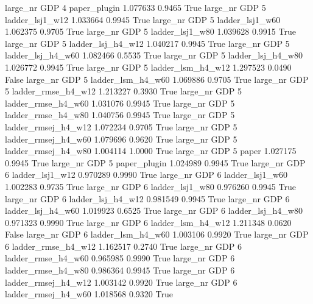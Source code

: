   large_nr      GDP                 4        paper_plugin   1.077633      0.9465    True
  large_nr      GDP                 5     ladder_lsj1_w12   1.033664      0.9945    True
  large_nr      GDP                 5     ladder_lsj1_w60   1.062375      0.9705    True
  large_nr      GDP                 5     ladder_lsj1_w80   1.039628      0.9915    True
  large_nr      GDP                 5   ladder_lsj_h4_w12   1.040217      0.9945    True
  large_nr      GDP                 5   ladder_lsj_h4_w60   1.082466      0.5535    True
  large_nr      GDP                 5   ladder_lsj_h4_w80   1.026772      0.9945    True
  large_nr      GDP                 5   ladder_lsm_h4_w12   1.297523      0.0490   False
  large_nr      GDP                 5   ladder_lsm_h4_w60   1.069886      0.9705    True
  large_nr      GDP                 5  ladder_rmse_h4_w12   1.213227      0.3930    True
  large_nr      GDP                 5  ladder_rmse_h4_w60   1.031076      0.9945    True
  large_nr      GDP                 5  ladder_rmse_h4_w80   1.040756      0.9945    True
  large_nr      GDP                 5 ladder_rmsej_h4_w12   1.072234      0.9705    True
  large_nr      GDP                 5 ladder_rmsej_h4_w60   1.079696      0.9620    True
  large_nr      GDP                 5 ladder_rmsej_h4_w80   1.004114      1.0000    True
  large_nr      GDP                 5               paper   1.027175      0.9945    True
  large_nr      GDP                 5        paper_plugin   1.024989      0.9945    True
  large_nr      GDP                 6     ladder_lsj1_w12   0.970289      0.9990    True
  large_nr      GDP                 6     ladder_lsj1_w60   1.002283      0.9735    True
  large_nr      GDP                 6     ladder_lsj1_w80   0.976260      0.9945    True
  large_nr      GDP                 6   ladder_lsj_h4_w12   0.981549      0.9945    True
  large_nr      GDP                 6   ladder_lsj_h4_w60   1.019923      0.6525    True
  large_nr      GDP                 6   ladder_lsj_h4_w80   0.971323      0.9990    True
  large_nr      GDP                 6   ladder_lsm_h4_w12   1.211348      0.0620   False
  large_nr      GDP                 6   ladder_lsm_h4_w60   1.003106      0.9920    True
  large_nr      GDP                 6  ladder_rmse_h4_w12   1.162517      0.2740    True
  large_nr      GDP                 6  ladder_rmse_h4_w60   0.965985      0.9990    True
  large_nr      GDP                 6  ladder_rmse_h4_w80   0.986364      0.9945    True
  large_nr      GDP                 6 ladder_rmsej_h4_w12   1.003142      0.9920    True
  large_nr      GDP                 6 ladder_rmsej_h4_w60   1.018568      0.9320    True
